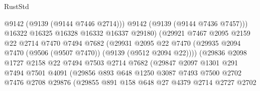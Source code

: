 \begin{lexlean}{RustStd}
\begin{coremodule}
                                  @9142
                                  (@9139 (@9144 @7446 @2714)))
                                @9142
                                (@9139 (@9144 @7436 @7457)))
                              @16322
                              @16325
                              @16328
                              @16332
                              @16337
                              @29180)
                            (@29921
                              @7467
                              @2095
                              @2159
                              @22
                              @2714
                              @7470
                              @7494
                              @7682
                              (@29931
                                @2095
                                @22
                                @7470
                                (@29935
                                  @2094
                                  @7470
                                  (@9506 (@9507 @7470))
                                  (@9139 (@9512 @2094 @22))))
                              (@29836
                                @2098
                                @1727
                                @2158
                                @22
                                @7494
                                @7503
                                @2714
                                @7682
                                (@29847
                                  @2097
                                  @1301
                                  @291
                                  @7494
                                  @7501
                                  @4091
                                  (@29856
                                    @893
                                    @648
                                    @1250
                                    @3087
                                    @7493
                                    @7500
                                    @2702
                                    @7476
                                    @2708
                                    @29876
                                    (@29855
                                      @891
                                      @158
                                      @648
                                      @27
                                      @4379
                                      @2714
                                      @2727
                                      @2702

\end{coremodule}
\end{lexlean}
